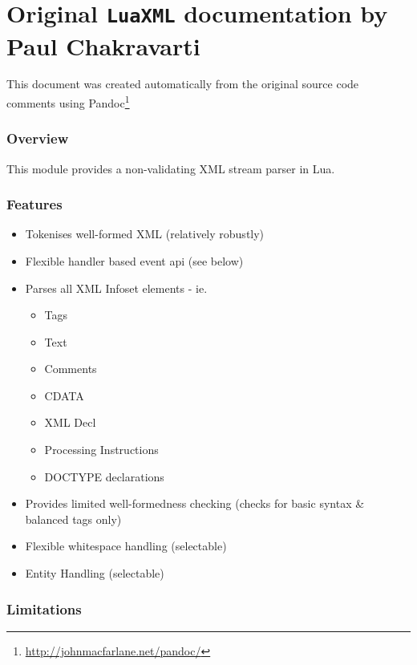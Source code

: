 \documentclass{ltxdoc}
\begin{document}


\clearpage
\part{Original \texttt{LuaXML} documentation by Paul Chakravarti}
\medskip

\noindent This document was created automatically from the original source code comments using Pandoc\footnote{\url{http://johnmacfarlane.net/pandoc/}} 

\section{Overview}


This module provides a non-validating XML stream parser in Lua. 
\section{Features}

\begin{itemize}
\item
  Tokenises well-formed XML (relatively robustly)
\item
  Flexible handler based event api (see below)
\item
  Parses all XML Infoset elements - ie.
  \begin{itemize}
  \item
    Tags
  \item
    Text
  \item
    Comments
  \item
    CDATA
  \item
    XML Decl
  \item
    Processing Instructions
  \item
    DOCTYPE declarations
  \end{itemize}
\item
  Provides limited well-formedness checking (checks for basic syntax \&
  balanced tags only)
\item
  Flexible whitespace handling (selectable)
\item
  Entity Handling (selectable)
\end{itemize}
\section{Limitations}
\end{document}
